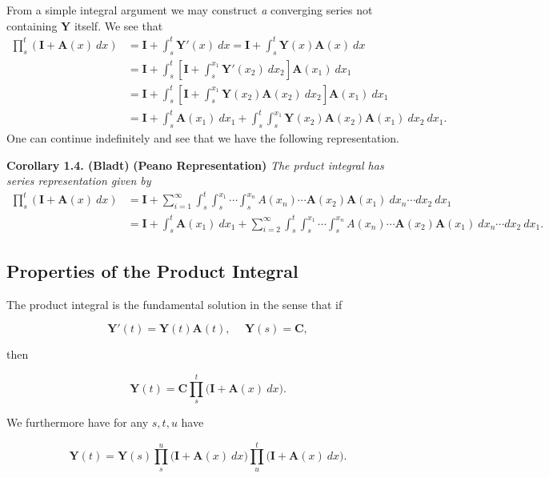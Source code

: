 \documentclass[a4paper,12pt,openany]{book}
\begin{document}
From a simple integral argument we may construct \emph{a} converging series not containing \(\mathbf{Y}\) itself. We see that
\begin{align*}
\prod_{s}^t(\mathbf{I}+\mathbf{A}(x)\ dx)&=\mathbf{I}+\int_s^t\mathbf{Y}'(x)\ dx=\mathbf{I}+\int_s^t\mathbf{Y}(x)\mathbf{A}(x)\ dx\\
&=\mathbf{I}+\int_s^t\left[ \mathbf{I}+\int_s^{x_1}\mathbf{Y}'(x_2)\ dx_2\right]\mathbf{A}(x_1)\ dx_1\\
&=\mathbf{I}+\int_s^t\left[ \mathbf{I}+\int_s^{x_1}\mathbf{Y}(x_2)\mathbf{A}(x_2)\ dx_2\right]\mathbf{A}(x_1)\ dx_1\\
&=\mathbf{I}+\int_s^t\mathbf{A}(x_1)\ dx_1+\int_s^t\int_s^{x_1}\mathbf{Y}(x_2)\mathbf{A}(x_2)\mathbf{A}(x_1)\ dx_2\ dx_1.
\end{align*}
One can continue indefinitely and see that we have the following representation.

\textbf{Corollary 1.4. (Bladt)} \textbf{(Peano Representation)} \emph{The prduct integral has series representation given by}
\begin{align*}
\prod_{s}^t(\mathbf{I}+\mathbf{A}(x)\ dx)&=\mathbf{I}+\sum_{i=1}^\infty\int_s^t\int_s^{x_1}\cdots\int_s^{x_n}A(x_n)\cdots\mathbf{A}(x_2)\mathbf{A}(x_1)\ dx_n\cdots dx_2\ dx_1\\
&=\mathbf{I}+\int_s^t\mathbf{A}(x_1)\ dx_1+\sum_{i=2}^\infty\int_s^t\int_s^{x_1}\cdots\int_s^{x_n}A(x_n)\cdots\mathbf{A}(x_2)\mathbf{A}(x_1)\ dx_n\cdots dx_2\ dx_1.
\end{align*}

\hypertarget{properties-of-the-product-integral}{%
\subsection{Properties of the Product Integral}\label{properties-of-the-product-integral}}

The product integral is the fundamental solution in the sense that if

\[
\mathbf{Y}'(t)=\mathbf{Y}(t)\mathbf{A}(t),\hspace{15pt}\mathbf{Y}(s)=\mathbf{C},
\]

then

\[
\mathbf{Y}(t)=\mathbf{C}\prod_{s}^t\big(\mathbf{I}+\mathbf{A}(x)\ dx\big).
\]

We furthermore have for any \(s,t,u\) have

\[
\mathbf{Y}(t)=\mathbf{Y}(s)\prod_{s}^u\big(\mathbf{I}+\mathbf{A}(x)\ dx\big)\prod_{u}^t\big(\mathbf{I}+\mathbf{A}(x)\ dx\big).
\]
\end{document}
